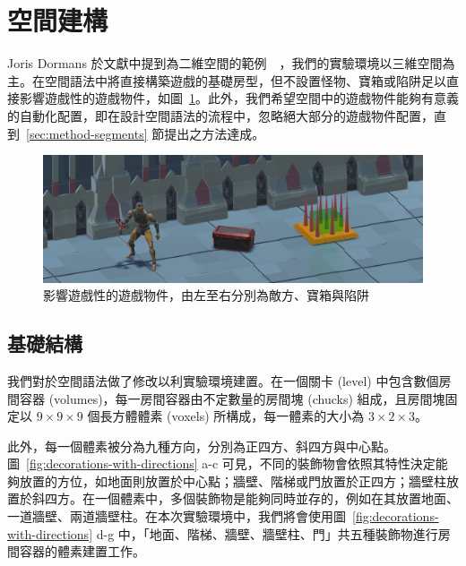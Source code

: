 \clearpage

\section{空間建構}
\label{sec:method-spacepieces}

Joris Dormans 於文獻中提到為二維空間的範例~\cite{dormans2010adventures}~\cite{dormans2012engineering}，我們的實驗環境以三維空間為主。在空間語法中將直接構築遊戲的基礎房型，但不設置怪物、寶箱或陷阱足以直接影響遊戲性的遊戲物件，如圖~\ref{fig:gameobject-list}。此外，我們希望空間中的遊戲物件能夠有意義的自動化配置，即在設計空間語法的流程中，忽略絕大部分的遊戲物件配置，直到~\ref{sec:method-segments} 節提出之方法達成。

\begin{figure}[!htb]
  \begin{center}
    \includegraphics[width=1.0\textwidth]{figures/gameobject-list.png}
    \caption{影響遊戲性的遊戲物件，由左至右分別為敵方、寶箱與陷阱} 
    \label{fig:gameobject-list}
  \end{center}
\end{figure}

\subsection{基礎結構}
\label{ssec:method-spacepieces-basic}

我們對於空間語法做了修改以利實驗環境建置。在一個關卡 (level) 中包含數個房間容器 (volumes)，每一房間容器由不定數量的房間塊 (chucks) 組成，且房間塊固定以 $9\times 9\times 9$ 個長方體體素 (voxels) 所構成，每一體素的大小為 $3\times 2\times 3$。

此外，每一個體素被分為九種方向，分別為正四方、斜四方與中心點。圖~\ref{fig:decorations-with-directions} a-c 可見，不同的裝飾物會依照其特性決定能夠放置的方位，如地面則放置於中心點；牆壁、階梯或門放置於正四方；牆壁柱放置於斜四方。在一個體素中，多個裝飾物是能夠同時並存的，例如在其放置地面、一道牆壁、兩道牆壁柱。在本次實驗環境中，我們將會使用圖~\ref{fig:decorations-with-directions} d-g 中，「地面、階梯、牆壁、牆壁柱、門」共五種裝飾物進行房間容器的體素建置工作。

